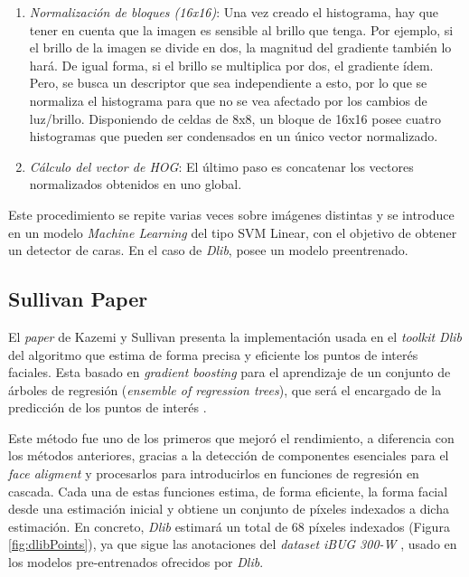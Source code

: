 \begin{enumerate}
	\item \textit{Normalización de bloques (16x16)}: Una vez creado el histograma, hay que tener en cuenta que la imagen es sensible al brillo que tenga. Por ejemplo, si el brillo de la imagen se divide en dos, la magnitud del gradiente también lo hará. De igual forma, si el brillo se multiplica por dos, el gradiente ídem. Pero, se busca un descriptor que sea independiente a esto, por lo que se normaliza el histograma para que no se vea afectado por los cambios de luz/brillo.	Disponiendo de celdas de 8x8, un bloque de 16x16 posee cuatro histogramas que pueden ser condensados en un único vector normalizado.
	
	\item \textit{Cálculo del vector de HOG}: El último paso es concatenar los vectores normalizados obtenidos en uno global.

\end{enumerate}

Este procedimiento se repite varias veces sobre imágenes distintas y se introduce en un modelo \textit{Machine Learning} del tipo SVM Linear, con el objetivo de obtener un detector de caras. En el caso de \textit{Dlib}, posee un modelo preentrenado.


\subsection*{Sullivan Paper}

El \textit{paper} de Kazemi y Sullivan presenta la implementación usada en el \textit{toolkit Dlib} del algoritmo que estima de forma precisa y eficiente los puntos de interés faciales. Esta basado en \textit{gradient boosting} para el aprendizaje de un conjunto de árboles de regresión (\textit{ensemble of regression trees}), que será el encargado de la predicción de los puntos de interés \cite{faceLandmark}.

Este método fue uno de los primeros que mejoró el rendimiento, a diferencia con los métodos anteriores, gracias a la detección de componentes esenciales para el \textit{face aligment} y procesarlos para introducirlos en funciones de regresión en cascada. Cada una de estas funciones estima, de forma eficiente, la forma facial desde una estimación inicial y obtiene un conjunto de píxeles indexados a dicha estimación. En concreto, \textit{Dlib} estimará un total de 68 píxeles indexados (Figura \ref{fig:dlibPoints}), ya que sigue las anotaciones del \textit{dataset iBUG 300-W} \cite{ibug}, usado en los modelos pre-entrenados ofrecidos por \textit{Dlib}.

